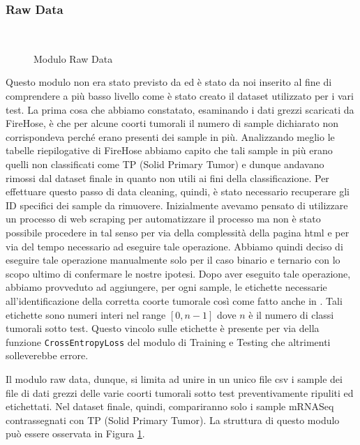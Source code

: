 \subsubsection{Raw Data}~ \newline
\begin{figure}[hbpt!]
		\centering
		
  		\caption{Modulo Raw Data}
        \label{fig:raw-data-module}
\end{figure}
Questo modulo non era stato previsto da \cite{lyu2018deep} ed è stato da noi inserito al fine di comprendere a più 
basso livello come è stato creato il dataset utilizzato per i vari test. 
La prima cosa che abbiamo constatato, esaminando i dati grezzi scaricati da FireHose, è che per alcune coorti 
tumorali il numero di sample dichiarato non corrispondeva perché erano presenti dei sample in più. Analizzando meglio 
le tabelle riepilogative di FireHose abbiamo capito che tali sample in più erano quelli non classificati come TP 
(Solid Primary Tumor) e dunque andavano rimossi dal dataset finale in quanto non utili ai fini della classificazione. 
Per effettuare questo passo di data cleaning, quindi, è stato necessario recuperare gli ID specifici dei sample da
rimuovere.
Inizialmente avevamo pensato di utilizzare un processo di web scraping per automatizzare il processo ma non è 
stato possibile procedere in tal senso per via della complessità della pagina html e per via del tempo necessario 
ad eseguire tale operazione.
Abbiamo quindi deciso di eseguire tale operazione manualmente solo per il caso binario e ternario con lo scopo ultimo 
di confermare le nostre ipotesi. Dopo aver eseguito tale operazione, abbiamo provveduto ad aggiungere, per ogni sample,
le etichette necessarie all'identificazione della corretta coorte tumorale così come fatto anche in \cite{lyu2018deep}.
Tali etichette sono numeri interi nel range $[0, n-1]$ dove $n$ è il numero di classi tumorali sotto test.
Questo vincolo sulle etichette è presente per via della funzione \texttt{CrossEntropyLoss} del modulo di Training 
e Testing che altrimenti solleverebbe errore.

Il modulo raw data, dunque, si limita ad unire in un unico file csv i sample dei file di dati grezzi delle varie coorti
tumorali sotto test preventivamente ripuliti ed etichettati. Nel dataset finale, quindi, compariranno solo i sample
mRNASeq contrassegnati con TP (Solid Primary Tumor). La struttura di questo modulo può essere osservata in 
Figura \ref{fig:raw-data-module}.

